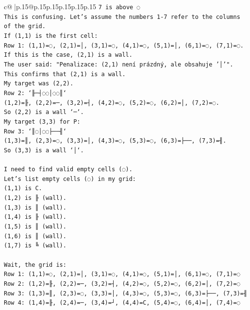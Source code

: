\documentclass{article}
\begin{document}
{\begin{supertabular}{c@{$\;$}|p{.15\linewidth}@{}p{.15\linewidth}p{.15\linewidth}p{.15\linewidth}p{.15\linewidth}p{.15\linewidth}}
{{{\texttt{7 is above ◌} \\
\texttt{This is confusing. Let's assume the numbers 1{-}7 refer to the columns of the grid.} \\
\texttt{If (1,1) is the first cell:} \\
\texttt{Row 1: (1,1)=◌, (2,1)=│, (3,1)=◌, (4,1)=◌, (5,1)=│, (6,1)=◌, (7,1)=◌.} \\
\texttt{If this is the case, (2,1) is a wall.} \\
\texttt{The user said: "Penalizace: (2,1) není prázdný, ale obsahuje '│'".} \\
\texttt{This confirms that (2,1) is a wall.} \\
\texttt{My target was (2,2).} \\
\texttt{Row 2: `╟─┤◌◌│◌◌║`} \\
\texttt{(1,2)=╟, (2,2)=─, (3,2)=┤, (4,2)=◌, (5,2)=◌, (6,2)=│, (7,2)=◌.} \\
\texttt{So (2,2) is a wall `─`.} \\
\texttt{My target (3,3) for P:} \\
\texttt{Row 3: `║◌│◌◌├──╢`} \\
\texttt{(1,3)=║, (2,3)=◌, (3,3)=│, (4,3)=◌, (5,3)=◌, (6,3)=├──, (7,3)=╢.} \\
\texttt{So (3,3) is a wall `│`.} \\
\\ 
\texttt{I need to find valid empty cells (◌).} \\
\texttt{Let's list empty cells (◌) in my grid:} \\
\texttt{(1,1) is C.} \\
\texttt{(1,2) is ╟ (wall).} \\
\texttt{(1,3) is ║ (wall).} \\
\texttt{(1,4) is ╟ (wall).} \\
\texttt{(1,5) is ║ (wall).} \\
\texttt{(1,6) is ║ (wall).} \\
\texttt{(1,7) is ╚ (wall).} \\
\\ 
\texttt{Wait, the grid is:} \\
\texttt{Row 1: (1,1)=◌, (2,1)=│, (3,1)=◌, (4,1)=◌, (5,1)=│, (6,1)=◌, (7,1)=◌} \\
\texttt{Row 2: (1,2)=╟, (2,2)=─, (3,2)=┤, (4,2)=◌, (5,2)=◌, (6,2)=│, (7,2)=◌} \\
\texttt{Row 3: (1,3)=║, (2,3)=◌, (3,3)=│, (4,3)=◌, (5,3)=◌, (6,3)=├──, (7,3)=╢} \\
\texttt{Row 4: (1,4)=╟, (2,4)=─, (3,4)=┘, (4,4)=C, (5,4)=◌, (6,4)=│, (7,4)=◌} \\
}}}
\end{supertabular}}
\end{document}

